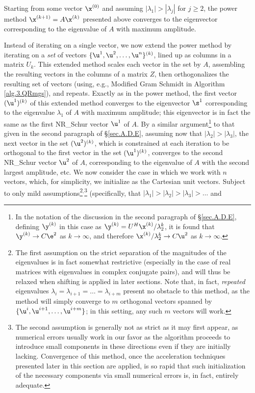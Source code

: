 
\noindent Starting from some vector $\x^{(0)}$ and assuming $|\lambda_1|>|\lambda_j|$ for $j\ge 2$,
the power method $\x^{(k+1)}=A\x^{(k)}$ presented above converges to the eigenvector corresponding
to the eigenvalue of $A$ with maximum amplitude. 

Instead of iterating on a single vector, we now extend the power method by iterating on a {\it set} of vectors $\{\u^{1},\u^{2},\ldots,\u^{n}\}^{(k)}$,
lined up as columns in a matrix ${U_k}$.  This extended method scales each vector in the set by $A$, assembling the resulting vectors in the columns of
a matrix $Z$, then orthogonalizes the resulting set of vectors (using, e.g., Modified Gram Schmidt in Algorithm \ref{alg.3.QRmgs}), and repeats.  
Exactly as in the power method, the first vector $(\u^{1})^{(k)}$ of this extended method converges to the eigenvector $\s^1$
corresponding to the eigenvalue $\lambda_1$ of $A$ with
maximum amplitude; this eigenvector is in fact the same as the first NR_Schur vector $\u^1$ of $A$.  By a similar argument\footnote{In the notation
of the discussion in the second paragraph of \S \ref{sec.A.D.E}, defining $\y^{(k)}$ in this case as $\y^{(k)}=U^H\x^{(k)}/\lambda^k_2$,
it is found that $\y^{(k)}\rightarrow C\e^2$ as $k\rightarrow\infty$, and therefore $\x^{(k)}/\lambda_2^k\rightarrow C\u^2$  as
$k\rightarrow\infty$.} to that given in the second paragraph of \S \ref{sec.A.D.E}, assuming now that $|\lambda_2|>|\lambda_3|$,
the next vector in the set $(\u^{2})^{(k)}$, which is constrained at each iteration to be orthogonal to the first vector in the set $(\u^{1})^{(k)}$,
converges to the second NR_Schur vector $\u^2$ of $A$, corresponding to the eigenvalue of $A$ with the second largest amplitude, etc.
We now consider the case in which we work with $n$ vectors, which, for simplicity, we initialize as the Cartesian unit vectors.  
Subject to only mild assumptions\footnote{The first assumption on the strict separation of the magnitudes of the eigenvalues
is in fact somewhat restrictive (especially in the case of real matrices with eigenvalues in complex conjugate pairs),
and will thus be relaxed when shifting is applied in later sections.  Note that, in fact, {\it repeated} eigenvalues
$\lambda_i=\lambda_{i+1}=\ldots=\lambda_{i+m}$
present no obstacle to this method, as the method will simply converge to $m$ orthogonal vectors spanned by $\{\u^i,\u^{i+1},\ldots,\u^{i+m}\}$;
in this setting, any such $m$ vectors will work.}$^{,}$\footnote{The \label{footnoteC} second assumption is generally not as strict as it may first appear, as numerical errors
usually work in our favor as the algorithm proceeds to introduce
small components in these directions even if they are initially lacking.  Convergence of this method, once the acceleration techniques
presented later in this section are applied, is so rapid that such initialization of the necessary components
via small numerical errors is, in fact, entirely adequate.} (specifically, that $|\lambda_1|>|\lambda_2|>|\lambda_3|>\ldots$ and
